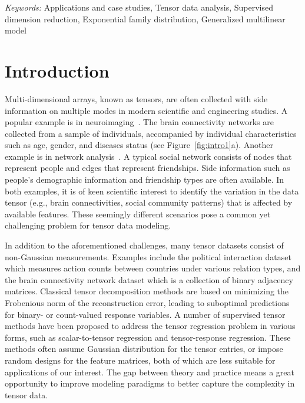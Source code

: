 \documentclass[12pt]{article}
\theoremstyle{definition}
\theoremstyle{definition}
\begin{document}
\noindent%
{\it Keywords:} Applications and case studies, Tensor data analysis, Supervised dimension reduction, Exponential family distribution, Generalized multilinear model
\vfill

\newpage
{} %
\section{Introduction}
\label{sec:intro}

Multi-dimensional arrays, known as tensors, are often collected with side information on multiple modes in modern scientific and engineering studies. A popular example is in neuroimaging~\citep{zhou2013tensor,wang2019common}. The brain connectivity networks are collected from a sample of individuals, accompanied by individual characteristics such as age, gender, and diseases status (see Figure~\ref{fig:intro1}a). Another example is in network analysis~\citep{pmlr-v108-berthet20a,hoff2005bilinear}. A typical social network consists of nodes that represent people and edges that represent  friendships. Side information such as people’s demographic information and friendship types are often available. In both examples, it is of keen scientific interest to identify the variation in the data tensor (e.g., brain connectivities, social community patterns) that is affected by available features. These seemingly different scenarios pose a common yet challenging problem for tensor data modeling. 

In addition to the aforementioned challenges, many tensor datasets consist of non-Gaussian measurements. Examples include the political interaction dataset \citep{hu2015scalable} which measures action counts between countries under various relation types, and the brain connectivity network dataset \citep{zhang2018mapping} which is a collection of binary adjacency matrices. Classical tensor decomposition methods are based on minimizing the Frobenious norm of the reconstruction error, leading to suboptimal predictions for binary- or count-valued response variables. A number of supervised tensor methods have been proposed \citep{narita2012tensor, zhao2012higher, yu2016learning} to address the tensor regression problem in various forms, such as scalar-to-tensor regression and tensor-response regression. These methods often assume Gaussian distribution for the tensor entries, or impose random designs for the feature matrices, both of which are less suitable for applications of our interest. The gap between theory and practice means a great opportunity to improve modeling paradigms to better capture the complexity in tensor data. 
\end{document}
